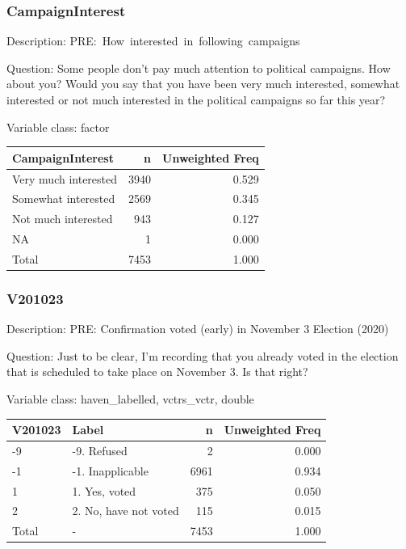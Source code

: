\documentclass[
]{krantz}
\begin{document}
\hypertarget{campaigninterest}{%
\subsubsection*{CampaignInterest}\label{campaigninterest}}


Description: PRE:~How~interested~in~following~campaigns

Question: Some people don't pay much attention to political campaigns. How about you? Would you say that you have been very much interested, somewhat interested or not much interested in the political campaigns so far this year?

Variable class: factor

\begin{tabular}[t]{l|r|r}
\hline
CampaignInterest & n & Unweighted Freq\\
\hline
Very much interested & 3940 & 0.529\\
\hline
Somewhat interested & 2569 & 0.345\\
\hline
Not much interested & 943 & 0.127\\
\hline
NA & 1 & 0.000\\
\hline
Total & 7453 & 1.000\\
\hline
\end{tabular}

\hypertarget{v201023}{%
\subsubsection*{V201023}\label{v201023}}


Description: PRE: Confirmation voted (early) in November 3 Election (2020)

Question: Just to be clear, I'm recording that you already voted in the election that is scheduled to take place on November 3. Is that right?

Variable class: haven\_labelled, vctrs\_vctr, double

\begin{tabular}[t]{l|l|r|r}
\hline
V201023 & Label & n & Unweighted Freq\\
\hline
-9 & -9. Refused & 2 & 0.000\\
\hline
-1 & -1. Inapplicable & 6961 & 0.934\\
\hline
1 & 1. Yes, voted & 375 & 0.050\\
\hline
2 & 2. No, have not voted & 115 & 0.015\\
\hline
Total & - & 7453 & 1.000\\
\hline
\end{tabular}
\end{document}
